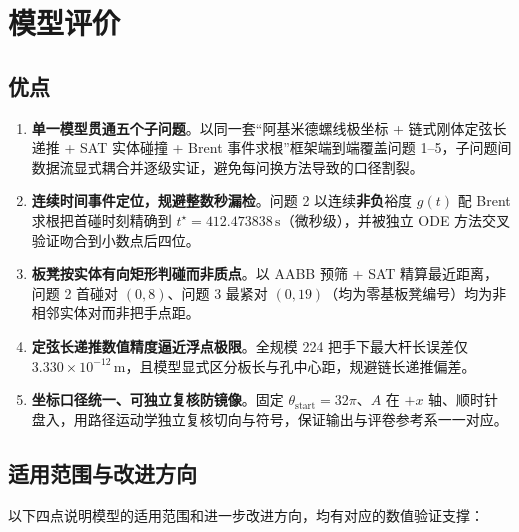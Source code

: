 \documentclass[a4paper, 12pt]{ctexart}
\begin{document}
\section{模型评价}
\label{sec:eval}

\subsection{优点}

\begin{enumerate}[leftmargin=2em]
  \item \textbf{单一模型贯通五个子问题}。以同一套“阿基米德螺线极坐标 + 链式刚体定弦长递推 + SAT 实体碰撞 + Brent 事件求根”框架端到端覆盖问题 1--5，子问题间数据流显式耦合并逐级实证，避免每问换方法导致的口径割裂。
  \item \textbf{连续时间事件定位，规避整数秒漏检}。问题 2 以连续\textbf{非负}裕度 $g(t)$ 配 Brent 求根把首碰时刻精确到 $t^\star=412.473838\,\mathrm{s}$（微秒级），并被独立 ODE 方法交叉验证吻合到小数点后四位。
  \item \textbf{板凳按实体有向矩形判碰而非质点}。以 AABB 预筛 + SAT 精算最近距离，问题 2 首碰对 $(0,8)$、问题 3 最紧对 $(0,19)$（均为零基板凳编号）均为非相邻实体对而非把手点距。
  \item \textbf{定弦长递推数值精度逼近浮点极限}。全规模 224 把手下最大杆长误差仅 $3.330\times10^{-12}\,\mathrm{m}$，且模型显式区分板长与孔中心距，规避链长递推偏差。
  \item \textbf{坐标口径统一、可独立复核防镜像}。固定 $\theta_{\text{start}}=32\pi$、$A$ 在 $+x$ 轴、顺时针盘入，用路径运动学独立复核切向与符号，保证输出与评卷参考系一一对应。
\end{enumerate}

\subsection{适用范围与改进方向}

以下四点说明模型的适用范围和进一步改进方向，均有对应的数值验证支撑：
\end{document}
